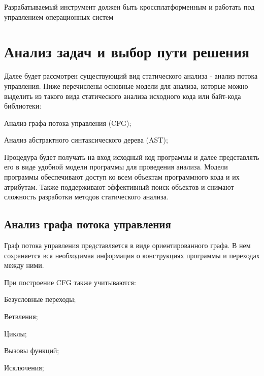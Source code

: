 Разрабатываемый инструмент должен быть кроссплатформенным и работать под управлением операционных систем

\section{Анализ задач и выбор пути решения}

Далее будет рассмотрен существующий вид статического анализа - анализ потока управления.
Ниже перечислены основные модели для анализа, которые можно выделить из такого вида статического анализа исходного кода или байт-кода библиотеки:
%
\begin{itemize*}
\item Анализ графа потока управления (CFG);
\item Анализ абстрактного синтаксического дерева (AST);
\end{itemize*}
%

Процедура будет получать на вход исходный код программы и далее представлять его в виде удобной модели программы для проведения анализа.
Модели программы обеспечивают доступ ко всем объектам программного кода и их атрибутам. Также поддерживают эффективный поиск объектов и снимают сложность разработки методов статического анализа.

\subsection{Анализ графа потока управления}

Граф потока управления представляется в виде ориентированного графа. В нем сохраняется вся необходимая информация о конструкциях программы и переходах между ними.

При построение CFG также учитываются:
%
\begin{itemize*}
\item Безусловные переходы;
\item Ветвления;
\item Циклы;
\item Вызовы функций;
\item Исключения;
\end{itemize*}
%

